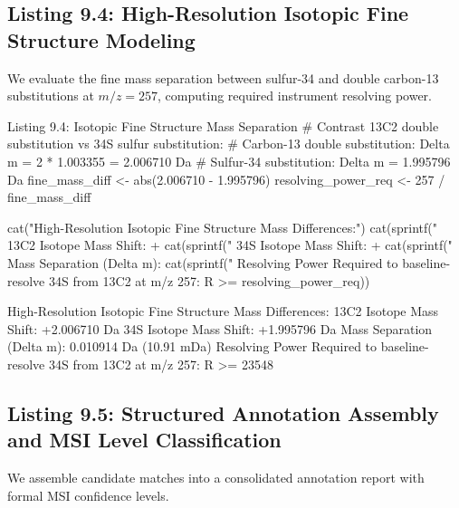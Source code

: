 \documentclass[11pt,twoside,openright]{book}
\begin{document}
\subsection{Listing 9.4: High-Resolution Isotopic Fine Structure Modeling}

We evaluate the fine mass separation between sulfur-34 and double carbon-13 substitutions at $m/z = 257$, computing required instrument resolving power.

\begin{rchunk}{Listing 9.4: Isotopic Fine Structure Mass Separation}
# Contrast 13C2 double substitution vs 34S sulfur substitution:
# Carbon-13 double substitution: Delta m = 2 * 1.003355 = 2.006710 Da
# Sulfur-34 substitution:        Delta m = 1.995796 Da
fine_mass_diff <- abs(2.006710 - 1.995796)
resolving_power_req <- 257 / fine_mass_diff

cat("High-Resolution Isotopic Fine Structure Mass Differences:\n")
cat(sprintf("  13C2 Isotope Mass Shift:  +%
cat(sprintf("  34S  Isotope Mass Shift:  +%
cat(sprintf("  Mass Separation (Delta m): %
cat(sprintf("  Resolving Power Required to baseline-resolve 34S from 13C2 at m/z 257: R >= %
            resolving_power_req))
\end{rchunk}

\begin{routput}
High-Resolution Isotopic Fine Structure Mass Differences:
  13C2 Isotope Mass Shift:  +2.006710 Da
  34S  Isotope Mass Shift:  +1.995796 Da
  Mass Separation (Delta m): 0.010914 Da (10.91 mDa)
  Resolving Power Required to baseline-resolve 34S from 13C2 at m/z 257: R >= 23548
\end{routput}

\subsection{Listing 9.5: Structured Annotation Assembly and MSI Level Classification}

We assemble candidate matches into a consolidated annotation report with formal MSI confidence levels.
\end{document}
